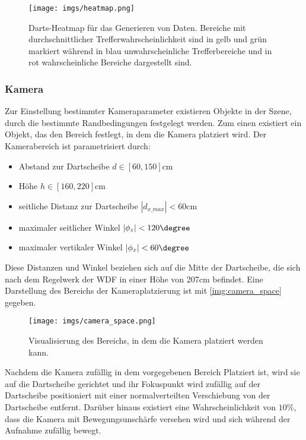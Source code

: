 \begin{figure}
    \centering
    \texttt{[image: imgs/heatmap.png]}
    \caption{Darts-Heatmap für das Generieren von Daten. Bereiche mit durchschnittlicher Trefferwahrscheinlichkeit sind in gelb und grün markiert während in blau unwahrscheinliche Trefferbereiche und in rot wahrscheinliche Bereiche dargestellt sind.}
    \label{img:heatmap}
\end{figure}

\subsubsection{Kamera}
\label{sec:impl:daten:python:kamera}

Zur Einstellung bestimmter Kameraparameter existieren Objekte in der Szene, durch die bestimmte Randbedingungen festgelegt werden. Zum einen existiert ein Objekt, das den Bereich festlegt, in dem die Kamera platziert wird. Der Kamerabereich ist parametrisiert durch:
\begin{itemize}
    \item Abstand zur Dartscheibe $d \in [60, 150]\text{cm}$
    \item Höhe $h \in [160, 220]\text{cm}$
    \item seitliche Distanz zur Dartscheibe $|d_{x\_max}| < 60\text{cm}$
    \item maximaler seitlicher Winkel $|\phi_z| < 120\degree$
    \item maximaler vertikaler Winkel $|\phi_x| < 60\degree$
\end{itemize}

Diese Distanzen und Winkel beziehen sich auf die Mitte der Dartscheibe, die sich nach dem Regelwerk der \ac{WDF} in einer Höhe von 207cm befindet. Eine Darstellung des Bereichs der Kameraplatzierung ist mit \autoref{img:camera_space} gegeben.

\begin{figure}
    \centering
    \texttt{[image: imgs/camera\_space.png]}
    \caption{Visualisierung des Bereichs, in dem die Kamera platziert werden kann.}
    \label{img:camera_space}
\end{figure}

Nachdem die Kamera zufällig in dem vorgegebenen Bereich Platziert ist, wird sie auf die Dartscheibe gerichtet und ihr Fokuspunkt wird zufällig auf der Dartscheibe positioniert mit einer normalverteilten Verschiebung von der Dartscheibe entfernt. Darüber hinaus existiert eine Wahrscheinlichkeit von $10\%$, dass die Kamera mit Bewegungsunschärfe versehen wird und sich während der Aufnahme zufällig bewegt.

